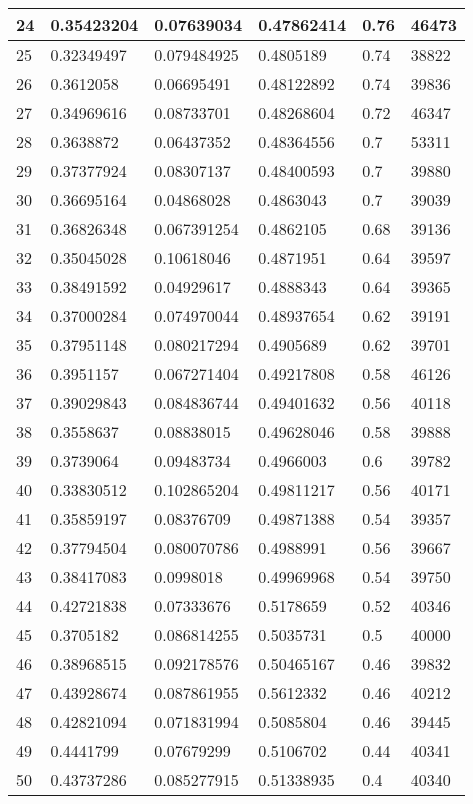 \begin{longtable}{|l|l|l|l|l|l|}
24 & 0.35423204 & 0.07639034 & 0.47862414 & 0.76 & 46473 \\ \hline 
25 & 0.32349497 & 0.079484925 & 0.4805189 & 0.74 & 38822 \\ \hline 
26 & 0.3612058 & 0.06695491 & 0.48122892 & 0.74 & 39836 \\ \hline 
27 & 0.34969616 & 0.08733701 & 0.48268604 & 0.72 & 46347 \\ \hline 
28 & 0.3638872 & 0.06437352 & 0.48364556 & 0.7 & 53311 \\ \hline 
29 & 0.37377924 & 0.08307137 & 0.48400593 & 0.7 & 39880 \\ \hline 
30 & 0.36695164 & 0.04868028 & 0.4863043 & 0.7 & 39039 \\ \hline 
31 & 0.36826348 & 0.067391254 & 0.4862105 & 0.68 & 39136 \\ \hline 
32 & 0.35045028 & 0.10618046 & 0.4871951 & 0.64 & 39597 \\ \hline 
33 & 0.38491592 & 0.04929617 & 0.4888343 & 0.64 & 39365 \\ \hline 
34 & 0.37000284 & 0.074970044 & 0.48937654 & 0.62 & 39191 \\ \hline 
35 & 0.37951148 & 0.080217294 & 0.4905689 & 0.62 & 39701 \\ \hline 
36 & 0.3951157 & 0.067271404 & 0.49217808 & 0.58 & 46126 \\ \hline 
37 & 0.39029843 & 0.084836744 & 0.49401632 & 0.56 & 40118 \\ \hline 
38 & 0.3558637 & 0.08838015 & 0.49628046 & 0.58 & 39888 \\ \hline 
39 & 0.3739064 & 0.09483734 & 0.4966003 & 0.6 & 39782 \\ \hline 
40 & 0.33830512 & 0.102865204 & 0.49811217 & 0.56 & 40171 \\ \hline 
41 & 0.35859197 & 0.08376709 & 0.49871388 & 0.54 & 39357 \\ \hline 
42 & 0.37794504 & 0.080070786 & 0.4988991 & 0.56 & 39667 \\ \hline 
43 & 0.38417083 & 0.0998018 & 0.49969968 & 0.54 & 39750 \\ \hline 
44 & 0.42721838 & 0.07333676 & 0.5178659 & 0.52 & 40346 \\ \hline 
45 & 0.3705182 & 0.086814255 & 0.5035731 & 0.5 & 40000 \\ \hline 
46 & 0.38968515 & 0.092178576 & 0.50465167 & 0.46 & 39832 \\ \hline 
47 & 0.43928674 & 0.087861955 & 0.5612332 & 0.46 & 40212 \\ \hline 
48 & 0.42821094 & 0.071831994 & 0.5085804 & 0.46 & 39445 \\ \hline 
49 & 0.4441799 & 0.07679299 & 0.5106702 & 0.44 & 40341 \\ \hline 
50 & 0.43737286 & 0.085277915 & 0.51338935 & 0.4 & 40340 \\ \hline 
\end{longtable}